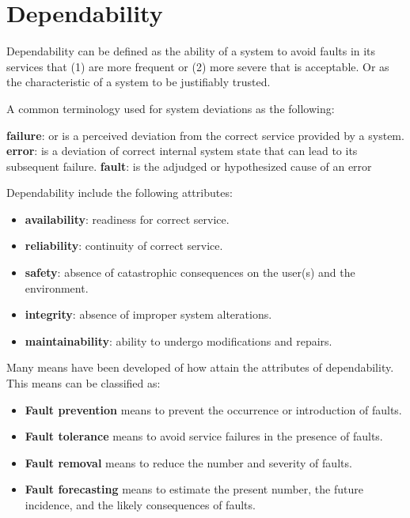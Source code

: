 \section{Dependability}
Dependability can be defined as the ability of a system to avoid faults in its services
that (1) are more frequent or (2) more severe that is acceptable. Or as the characteristic of a system to be justifiably trusted.

A common terminology used for system deviations as the following: \cite{avizienis_basic_2004}

\begin{itemize}
  \textbf{failure}: or  is a perceived deviation from the correct service provided by a system.
  \textbf{error}: is a deviation of correct internal system state that can lead to its subsequent failure.
  \textbf{fault}: is the adjudged or
hypothesized cause of an error
\end{itemize}

Dependability include the following attributes:\cite{avizienis_basic_2004}
\begin{itemize}
  \item \textbf{availability}: readiness for correct service.
  \item \textbf{reliability}: continuity of correct service.
  \item \textbf{safety}: absence of catastrophic consequences on the
user(s) and the environment.
  \item \textbf{integrity}: absence of improper system alterations.
  \item \textbf{maintainability}: ability to undergo modifications and repairs.
\end{itemize}


Many means have been developed of how attain the attributes of dependability. This means can be classified as:

\begin{itemize}
  \item \textbf{Fault prevention} means to prevent the occurrence or introduction of faults.
  \item \textbf{Fault tolerance} means to avoid service failures in the presence of faults.
  \item \textbf{Fault removal} means to reduce the number and severity of faults.
  \item \textbf{Fault forecasting} means to estimate the present number, the future incidence, and the likely consequences of faults.
\end{itemize}


